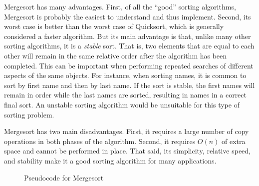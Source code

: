 \documentclass{article}
\begin{document}
Mergesort has many advantages. First, of all the ``good'' sorting algorithms, Mergesort is probably
the easiest to understand and thus implement. Second, its worst case is better than the worst
case of Quicksort, which is generally considered a faster algorithm. But its main advantage is that,
unlike many other sorting algorithms, it is a \textit{stable} sort. That is, two elements that are equal 
to each other will remain in the same relative order after the algorithm has been completed. This
can be important when performing repeated searches of different aspects of the same objects.
For instance, when sorting names, it is common to sort by first name and then by last name.
If the sort is stable, the first names will remain in order while the last names are sorted, resulting
in names in a correct final sort. An unstable sorting algorithm would be unsuitable for this
type of sorting problem.

Mergesort has two main disadvantages. First, it requires a large number of copy operations in both
phases of the algorithm. Second, it requires $O(n)$ of extra space and cannot be performed 
in place. That said, its simplicity, relative speed, and stability make it a good sorting algorithm
for many applications.

\begin{figure}
\caption{Pseudocode for Mergesort}
\label{pseudo-mergesort}
\end{figure}
	
\end{document}

